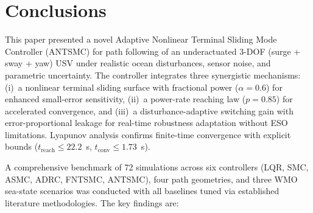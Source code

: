 \documentclass[review]{cas-dc}
\begin{document}
\section{Conclusions}
\label{sec:conclusion}

This paper presented a novel Adaptive Nonlinear Terminal Sliding Mode Controller (ANTSMC) for path following of an underactuated 3-DOF (surge + sway + yaw) USV under realistic ocean disturbances, sensor noise, and parametric uncertainty. The controller integrates three synergistic mechanisms: (i)~a nonlinear terminal sliding surface with fractional power ($\alpha = 0.6$) for enhanced small-error sensitivity, (ii)~a power-rate reaching law ($p = 0.85$) for accelerated convergence, and (iii)~a disturbance-adaptive switching gain with error-proportional leakage for real-time robustness adaptation without ESO limitations. Lyapunov analysis confirms finite-time convergence with explicit bounds ($t_{\mathrm{reach}} \leq 22.2$~s, $t_{\mathrm{conv}} \leq 1.73$~s).

A comprehensive benchmark of 72 simulations across six controllers (LQR, SMC, ASMC, ADRC, FNTSMC, ANTSMC), four path geometries, and three WMO sea-state scenarios was conducted with all baselines tuned via established literature methodologies. The key findings are:
\end{document}
